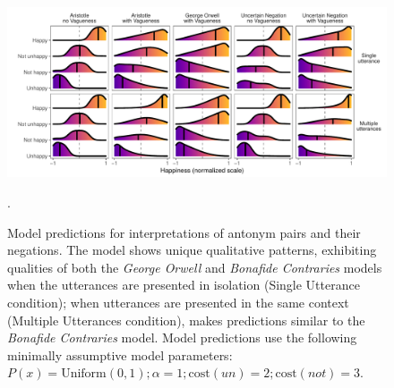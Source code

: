 \documentclass[floatsintext,doc]{apa6}
\begin{document}
\begin{figure}[t]
\centering \includegraphics{figs/alternativeModels_all5_fine_dists.pdf} 
\caption{Model predictions for interpretations of antonym pairs and their negations. The \emph{\ourmodel} model shows unique qualitative patterns, exhibiting qualities of both the \emph{George Orwell} and \emph{Bonafide Contraries} models when the utterances are presented in isolation (Single Utterance condition); when utterances are presented in the same context (Multiple Utterances condition), \emph{\ourmodel} makes predictions similar to the \emph{Bonafide Contraries} model. Model predictions use the following minimally assumptive model parameters: $P(x) = \text{Uniform}(0, 1); \alpha = 1; \text{cost}(\mathit{un}) = 2; \text{cost}(\mathit{not}) = 3$.}.\label{fig:modelPredictions}
\end{figure}
\newpage


\end{document}

